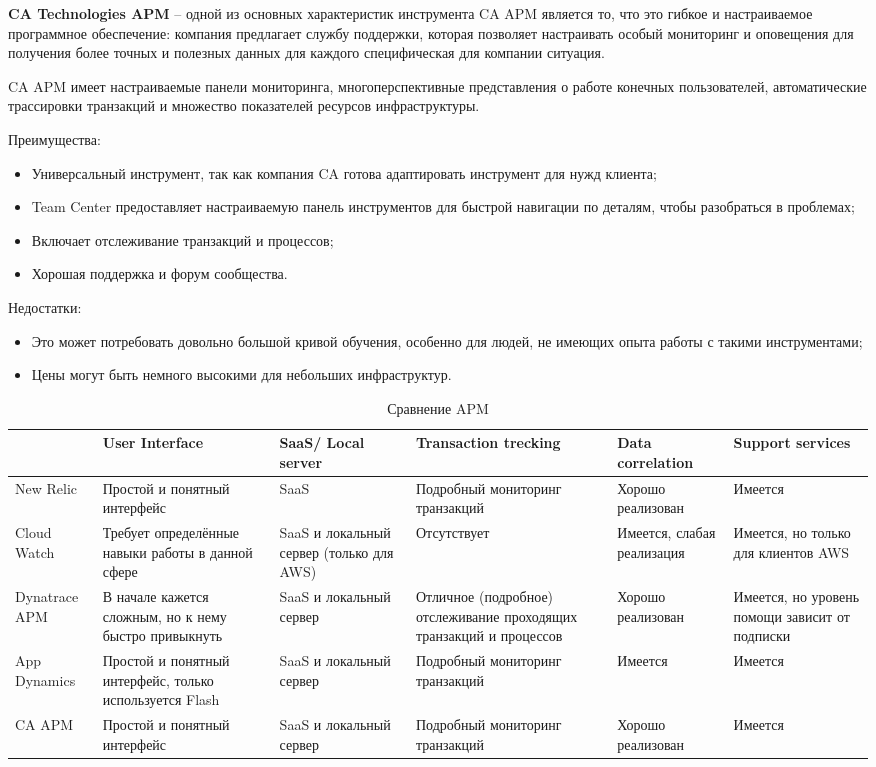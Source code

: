 \textbf{CA Technologies APM} – одной из основных характеристик инструмента CA APM является то, что это гибкое и настраиваемое программное обеспечение: компания предлагает службу поддержки, которая позволяет настраивать особый мониторинг и оповещения для получения более точных и полезных данных для каждого специфическая для компании ситуация. 

CA APM имеет настраиваемые панели мониторинга, многоперспективные представления о работе конечных пользователей, автоматические трассировки транзакций и множество показателей ресурсов инфраструктуры.\cite{Applicat77:online}

Преимущества:
\begin{itemize}
	\item Универсальный инструмент, так как компания CA готова адаптировать инструмент для нужд клиента;
	\item Team Center предоставляет настраиваемую панель инструментов для быстрой навигации по деталям, чтобы разобраться в проблемах;
	\item Включает отслеживание транзакций и процессов;
	\item Хорошая поддержка и форум сообщества.
\end{itemize}

Недостатки:
\begin{itemize}
	\item Это может потребовать довольно большой кривой обучения, особенно для людей, не имеющих опыта работы с такими инструментами;
	\item Цены могут быть немного высокими для небольших инфраструктур.
\end{itemize}



\begin{table}
	\caption{Сравнение APM}
	\label{comparisonOfAPM}
	\begin{tabularx}{\linewidth}{|p{1.8cm}|X|X|X|X|X|}
		\hline
	& User Interface &	SaaS/ Local server	& Transaction trecking	& Data correlation & Support services\\
		\hline
		New Relic &	Простой и понятный интерфейс &	SaaS	& Подробный мониторинг транзакций	& Хорошо реализован	& Имеется \\
		\hline
		Cloud Watch &	Требует определённые навыки работы в данной сфере & 	SaaS и локальный сервер (только для AWS) & 	Отсутствует	& Имеется, слабая реализация	& Имеется, но только для клиентов AWS \\
		\hline
		Dynatrace APM	& В начале кажется сложным, но к нему быстро привыкнуть	& SaaS и локальный сервер & 
		Отличное (подробное) отслеживание проходящих транзакций и процессов	& Хорошо реализован	& Имеется, но уровень помощи зависит от подписки \\
		\hline
		App Dynamics	& Простой и понятный интерфейс, только используется Flash	& SaaS и локальный сервер	& Подробный мониторинг транзакций	& Имеется	& Имеется \\
		\hline
		CA APM	& Простой и понятный интерфейс	& SaaS и локальный сервер	& Подробный мониторинг транзакций	& Хорошо реализован	& Имеется \\
		\hline		
	\end{tabularx}
\end{table}


